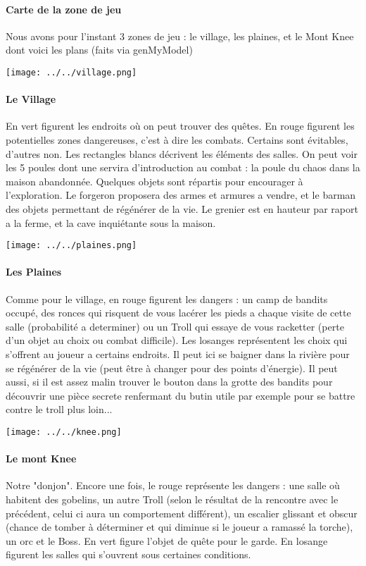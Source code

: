 \documentclass[11pt,a4paper]{report}
\begin{document}
\paragraph{Carte de la zone de jeu}
Nous avons pour l'instant 3 zones de jeu : le village, les plaines, et le Mont Knee dont voici les plans (faits via genMyModel)
\centerline{\texttt{[image: ../../village.png]}}
\paragraph{Le Village}
En vert figurent les endroits où on peut trouver des quêtes. En rouge figurent les potentielles zones dangereuses, c'est à dire les combats. Certains sont évitables, d'autres non. Les rectangles blancs décrivent les éléments des salles. On peut voir les 5 poules dont une servira d'introduction au combat : la poule du chaos dans la maison abandonnée. Quelques objets sont répartis pour encourager à l'exploration. Le forgeron proposera des armes et armures a vendre, et le barman des objets permettant de régénérer de la vie. Le grenier est en hauteur par raport a la ferme, et la cave inquiétante sous la maison.
\centerline{\texttt{[image: ../../plaines.png]}}
\paragraph{Les Plaines}
Comme pour le village, en rouge figurent les dangers : un camp de bandits occupé, des ronces qui risquent de vous lacérer les pieds a chaque visite de cette salle (probabilité a determiner) ou un Troll qui essaye de vous racketter (perte d'un objet au choix ou combat difficile). Les losanges représentent les choix qui s'offrent au joueur a certains endroits. Il peut ici se baigner dans la rivière pour se régénérer de la vie (peut être à changer pour des points d'énergie). Il peut aussi, si il est assez malin trouver le bouton dans la grotte des bandits pour découvrir une pièce secrete renfermant du butin utile par exemple pour se battre contre le troll plus loin...
\centerline{\texttt{[image: ../../knee.png]}}
\paragraph{Le mont Knee}
Notre "donjon". Encore une fois, le rouge représente les dangers : une salle où habitent des gobelins, un autre Troll (selon le résultat de la rencontre avec le précédent, celui ci aura un comportement différent), un escalier glissant et obscur (chance de tomber à déterminer et qui diminue si le joueur a ramassé la torche), un orc et le Boss. En vert figure l'objet de quête pour le garde. En losange figurent les salles qui s'ouvrent sous certaines conditions.
\end{document}
